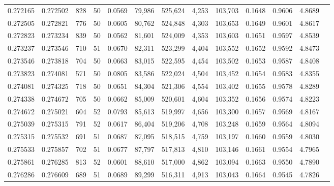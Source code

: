 \begin{tabular}{rrrrrrrrrrrrr}
0.272165 & 0.272502 &   828 &  50 &                                     0.0569 &  79,986 & 525,624 &   4,253 & 103,703 & 0.1648 & 0.9606 & 4.8689 \\
0.272505 & 0.272821 &   776 &  50 &                                     0.0605 &  80,762 & 524,848 &   4,303 & 103,653 & 0.1649 & 0.9601 & 4.8617 \\
0.272823 & 0.273234 &   839 &  50 &                                     0.0562 &  81,601 & 524,009 &   4,353 & 103,603 & 0.1651 & 0.9597 & 4.8539 \\
0.273237 & 0.273546 &   710 &  51 &                                     0.0670 &  82,311 & 523,299 &   4,404 & 103,552 & 0.1652 & 0.9592 & 4.8473 \\
0.273546 & 0.273818 &   704 &  50 &                                     0.0663 &  83,015 & 522,595 &   4,454 & 103,502 & 0.1653 & 0.9587 & 4.8408 \\
0.273823 & 0.274081 &   571 &  50 &                                     0.0805 &  83,586 & 522,024 &   4,504 & 103,452 & 0.1654 & 0.9583 & 4.8355 \\
0.274081 & 0.274325 &   718 &  50 &                                     0.0651 &  84,304 & 521,306 &   4,554 & 103,402 & 0.1655 & 0.9578 & 4.8289 \\
0.274338 & 0.274672 &   705 &  50 &                                     0.0662 &  85,009 & 520,601 &   4,604 & 103,352 & 0.1656 & 0.9574 & 4.8223 \\
0.274672 & 0.275021 &   604 &  52 &                                     0.0793 &  85,613 & 519,997 &   4,656 & 103,300 & 0.1657 & 0.9569 & 4.8167 \\
0.275039 & 0.275315 &   791 &  52 &                                     0.0617 &  86,404 & 519,206 &   4,708 & 103,248 & 0.1659 & 0.9564 & 4.8094 \\
0.275315 & 0.275532 &   691 &  51 &                                     0.0687 &  87,095 & 518,515 &   4,759 & 103,197 & 0.1660 & 0.9559 & 4.8030 \\
0.275533 & 0.275857 &   702 &  51 &                                     0.0677 &  87,797 & 517,813 &   4,810 & 103,146 & 0.1661 & 0.9554 & 4.7965 \\
0.275861 & 0.276285 &   813 &  52 &                                     0.0601 &  88,610 & 517,000 &   4,862 & 103,094 & 0.1663 & 0.9550 & 4.7890 \\
0.276286 & 0.276609 &   689 &  51 &                                     0.0689 &  89,299 & 516,311 &   4,913 & 103,043 & 0.1664 & 0.9545 & 4.7826 \\

\end{tabular}
